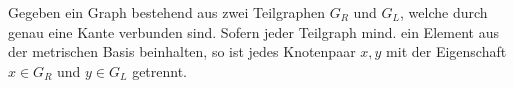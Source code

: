 \begin{lem}
\label{first_theorem}
Gegeben ein Graph bestehend aus zwei Teilgraphen $G_R$ und $G_L$, welche durch genau eine Kante verbunden sind. Sofern jeder Teilgraph mind. ein Element aus der metrischen Basis beinhalten, so ist jedes Knotenpaar $x,y$ mit der Eigenschaft $x \in G_R$ und $y \in G_L$ getrennt.
\end{lem}

